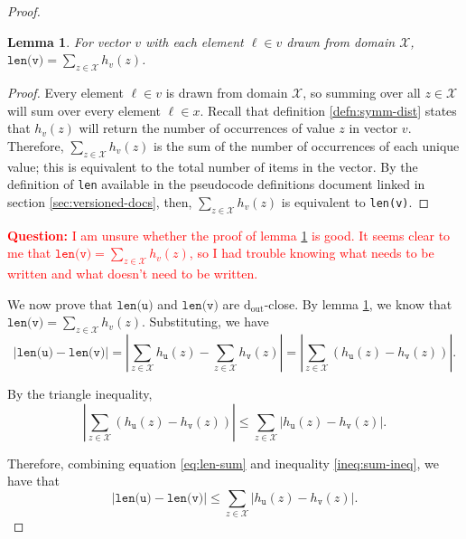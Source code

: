 \documentclass[12pt,letterpaper]{article}
\newcommand{\dout}{\mathrm{d_{out}}}
\newcommand{\question}[1]{\textcolor{red}{\textbf{Question:} #1}}
\newtheorem{lemma}[theorem]{Lemma}
\theoremstyle{definition}
\begin{document}
\begin{proof}
\begin{lemma}
\label{lemma:len-sum-equiv}
For vector $v$ with each element $\ell\in v$ drawn from domain $\mathcal{X}$, $\texttt{len(v)} = \sum_{z\in\mathcal{X}} h_v(z)$.
\end{lemma}

\begin{proof}

Every element $\ell \in v$ is drawn from domain $\mathcal{X}$, so summing over all $z\in \mathcal{X}$ will sum over every element $\ell\in x$. Recall that definition \ref{defn:symm-dist} states that $h_v(z)$ will return the number of occurrences of value $z$ in vector $v$. Therefore,  $\sum_{z\in\mathcal{X}} h_v(z)$ is the sum of the number of occurrences of each unique value; this is equivalent to the total number of items in the vector. By the definition of \texttt{len}
 available in the pseudocode definitions document linked in section \ref{sec:versioned-docs}, then, $\sum_{z\in\mathcal{X}} h_v(z)$ is equivalent to \texttt{len(v)}.

\end{proof}

\question{I am unsure whether the proof of lemma \ref{lemma:len-sum-equiv} is good. It seems clear to me that $\texttt{len(v)} = \sum_{z\in\mathcal{X}} h_v(z)$, so I had trouble knowing what needs to be written and what doesn't need to be written.}

We now prove that $\texttt{len(u)}$ and $\texttt{len(v)}$ are $\dout$-close. By lemma \ref{lemma:len-sum-equiv}, we know that $\texttt{len(v)} = \sum_{z\in\mathcal{X}} h_v(z)$. Substituting, we have
\begin{equation}
\label{eq:len-sum}
    |\texttt{len(u)} - \texttt{len(v)}|
    =
    |\sum_{z\in \mathcal{X}} h_{\texttt{u}}(z) - \sum_{z\in \mathcal{X}} h_{\texttt{v}}(z)|
    =
    |\sum_{z\in \mathcal{X}}\left(h_{\texttt{u}}(z) - h_{\texttt{v}}(z)\right)|.
\end{equation}

By the triangle inequality,
\begin{equation}
\label{ineq:sum-ineq}
    |\sum_{z\in \mathcal{X}}\left(h_{\texttt{u}}(z) - h_{\texttt{v}}(z)\right)|
    \leq 
    \sum_{z\in \mathcal{X}}|h_{\texttt{u}}(z) - h_{\texttt{v}}(z)|.
\end{equation}

Therefore, combining equation \ref{eq:len-sum} and inequality \ref{ineq:sum-ineq}, we have that
\begin{equation}
\label{ineq:relate-eqs}
    |\texttt{len(u)} - \texttt{len(v)}|
    \leq 
    \sum_{z\in \mathcal{X}}|h_{\texttt{u}}(z) - h_{\texttt{v}}(z)|.
\end{equation}


\end{proof}
\end{document}

